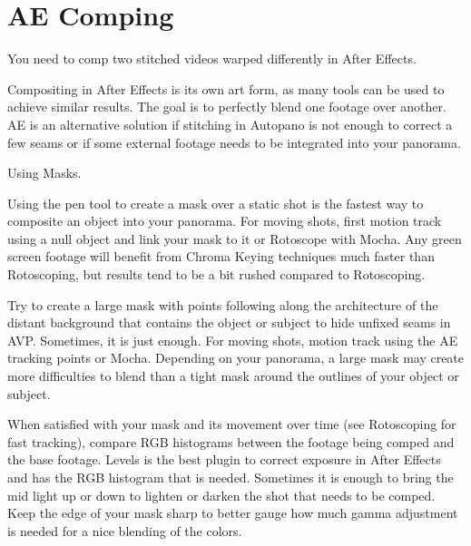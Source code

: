 \chapter{AE Comping}
\pagecolor{white}
\label{chap:51}
\begin{fullwidth}

\problem

{\large You need to comp two stitched videos warped differently in After Effects. \par}

Compositing in After Effects is its own art form, as many tools can be used to achieve similar results. The goal is to perfectly blend one footage over another. AE is an alternative solution if stitching in Autopano is not enough to correct a few seams or if some external footage needs to be integrated into your panorama.

\solution

{\large Using Masks. \par}

Using the pen tool to create a mask over a static shot is the fastest way to composite an object into your panorama. For moving shots, first motion track using a null object and link your mask to it or Rotoscope with Mocha. Any green screen footage will benefit from Chroma Keying techniques much faster than Rotoscoping, but results tend to be a bit rushed compared to Rotoscoping.


Try to create a large mask with points following along the architecture of the distant background that contains the object or subject to hide unfixed seams in AVP. Sometimes, it is just enough. For moving shots, motion track using the AE tracking points or Mocha. Depending on your panorama, a large mask may create more difficulties to blend than a tight mask around the outlines of your object or subject. 


When satisfied with your mask and its movement over time (see Rotoscoping for fast tracking), compare RGB histograms between the footage being comped and the base footage. Levels is the best plugin to correct exposure in After Effects and has the RGB histogram that is needed. Sometimes it is enough to bring the mid light up or down to lighten or darken the shot that needs to be comped. Keep the edge of your mask sharp to better gauge how much gamma adjustment is needed for a nice blending of the colors.


\end{fullwidth}
